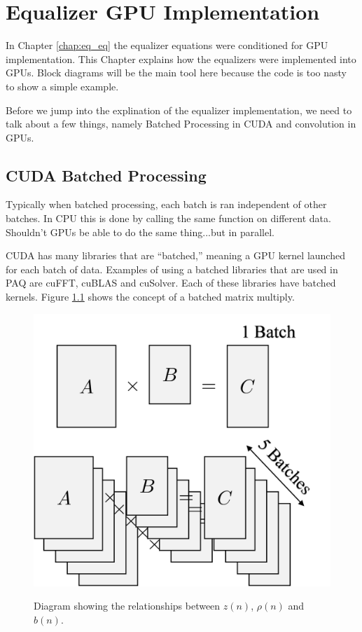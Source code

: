 \chapter{Equalizer GPU Implementation}
In Chapter \ref{chap:eq_eq} the equalizer equations were conditioned for GPU implementation.
This Chapter explains how the equalizers were implemented into GPUs.
Block diagrams will be the main tool here because the code is too nasty to show a simple example.

Before we jump into the explination of the equalizer implementation, we need to talk about a few things, namely Batched Processing in CUDA and convolution in GPUs.


\section{CUDA Batched Processing}
Typically when batched processing, each batch is ran independent of other batches.
In CPU this is done by calling the same function on different data.
Shouldn't GPUs be able to do the same thing...but in parallel.

CUDA has many libraries that are ``batched,'' meaning a GPU kernel launched for each batch of data.
Examples of using a batched libraries that are used in PAQ are cuFFT, cuBLAS and cuSolver.
Each of these libraries have batched kernels.
Figure \ref{fig:matrix_batch_vs_batched} shows the concept of a batched matrix multiply.
\begin{figure}
	\caption{Diagram showing the relationships between $z(n)$, $\rho(n)$ and $b(n)$.}
	\centering\includegraphics[width=4.13in/100*55]{figures/eq_GPUimplementation/matrix_batch_vs_batched.pdf}
	\label{fig:matrix_batch_vs_batched}
\end{figure}


